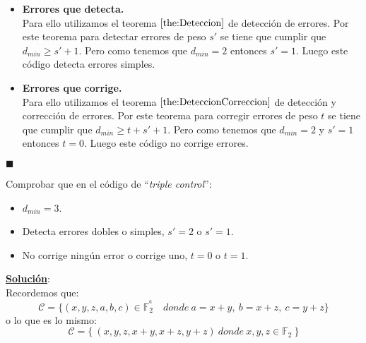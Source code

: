 \begin{itemize}
\begin{itemize}
\end{itemize}
\item \textbf{Errores que detecta.}\\
Para ello utilizamos el teorema $\ref{the:Deteccion}$ de detecci\'on de errores.
Por este teorema para detectar errores de peso $s'$ se tiene que cumplir que
$d_{min}\geq s'+1$. Pero 
como tenemos que $d_{min} = 2$ entonces $s'=1$. Luego este c\'odigo detecta
errores simples.
\item \textbf{Errores que corrige.}\\
Para ello utilizamos el teorema $\ref{the:DeteccionCorreccion}$ de
detecci\'on y correcci\'on de
errores. Por este teorema para corregir errores de peso $t$ se tiene que cumplir
que $d_{min}\geq t +s'+1$. Pero como tenemos que $d_{min} = 2$ y $s'=1$ entonces
$t=0$. Luego este c\'odigo no corrige errores.
\end{itemize}
\begin{flushright}
$\blacksquare$
\end{flushright}
%
%
\begin{ejercicio}\label{ejer:TripleControl}
Comprobar que en el c\'odigo de ``\emph{triple control}'':
\begin{itemize}
\item $d_{min}=3$.
\item Detecta errores dobles o simples, $s'=2$ o $s'=1$.
\item No corrige ning\'un error o corrige uno, $t=0$ o $t=1$.
\end{itemize}
\end{ejercicio}
\underline{\textbf{Soluci\'on}}:\\
Recordemos que:
\begin{displaymath}
\mathcal{C}=\{(x,y,z,a,b,c)\in \mathbb{F}^{^6}_2\quad donde\ a=x+y,\ b=x+z,\
c=y+z\}
\end{displaymath}
o lo que es lo mismo:
\begin{displaymath}
\mathcal{C}=\{\ (x,y,z,x+y,x+z,y+z)\ donde\ x,y,z\in \mathbb{F}_2\ \}
\end{displaymath}
